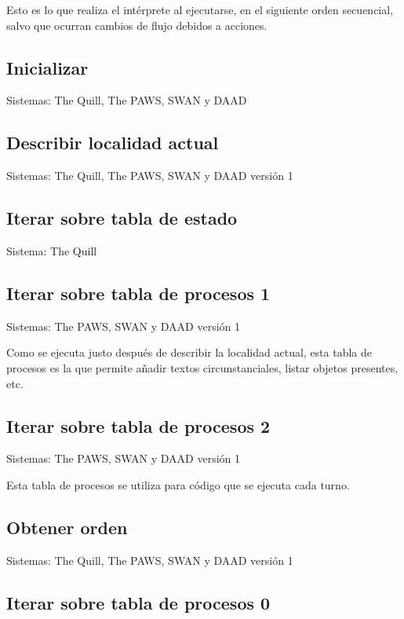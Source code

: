 \documentclass[11pt, a5paper]{article}
\newcommand{\quill}{\textsf{The Quill}\xspace}
\newcommand{\paw}{\textsf{The PAWS}\xspace}
\newcommand{\swan}{\textsf{SWAN}\xspace}
\newcommand{\daad}{\textsf{DAAD}\xspace}
\newcommand{\sistema}[1]{\noindent Sistema: #1 \nopagebreak}
\newcommand{\sistemas}[1]{\noindent Sistemas: #1 \nopagebreak}
\begin{document}
Esto es lo que realiza el intérprete al ejecutarse, en el siguiente orden secuencial, salvo que ocurran cambios de flujo debidos a acciones.

\subsection{Inicializar}

\sistemas{\quill, \paw, \swan y \daad}

\subsection{Describir localidad actual}

\sistemas{\quill, \paw, \swan y \daad versión 1}

\subsection{Iterar sobre tabla de estado}

\sistema{\quill}

\subsection{Iterar sobre tabla de procesos 1}

\sistemas{\paw, \swan y \daad versión 1}

Como se ejecuta justo después de describir la localidad actual, esta tabla de procesos es la que permite añadir textos circunstanciales, listar objetos presentes, etc.

\subsection{Iterar sobre tabla de procesos 2}

\sistemas{\paw, \swan y \daad versión 1}

Esta tabla de procesos se utiliza para código que se ejecuta cada turno.

\subsection{Obtener orden}

\sistemas{\quill, \paw, \swan y \daad versión 1}

\subsection{Iterar sobre tabla de procesos 0}
\end{document}
